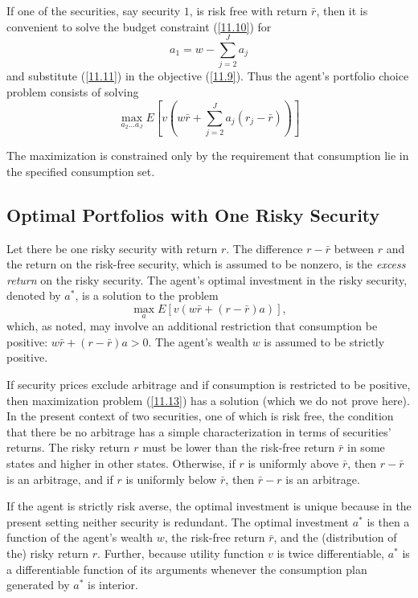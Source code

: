 \documentclass[\topdir/lecture\_notes.tex]{subfiles}
\begin{document}
If one of the securities, say security \(1\), is risk free with return \(\bar{r}\), then it is convenient to solve the budget constraint (\ref{11.10}) for
\begin{equation}
a_{1}=w-\sum_{j=2}^{J} a_{j} \label{11.11}
\end{equation}
and substitute (\ref{11.11}) in the objective (\ref{11.9}). Thus the agent's portfolio choice problem consists of solving
\begin{equation}
\max_{a_{2} \ldots a_{J}} E\left[v\left(w \bar{r}+\sum_{j=2}^{J} a_{j}(r_{j}-\bar{r})\right)\right] \label{eq:portfolio_choice_excess_returns} 
\end{equation}

The maximization is constrained only by the requirement that consumption lie in the specified consumption set.

\subsection{Optimal Portfolios with One Risky Security}
Let there be one risky security with return \(r\). The difference \(r-\bar{r}\) between \(r\) and the return on the risk-free security, which is assumed to be nonzero, is the \emph{excess return} on the risky security. The agent's optimal investment in the risky security, denoted by \(a^{*}\), is a solution to the problem
\begin{equation}
\max _{a} E[v(w \bar{r}+(r-\bar{r}) a)], \label{11.13}
\end{equation}
which, as noted, may involve an additional restriction that consumption be positive: \(w \bar{r}+(r-\bar{r}) a > 0\). The agent's wealth \(w\) is assumed to be strictly positive.

If security prices exclude arbitrage and if consumption is restricted to be positive, then maximization problem (\ref{11.13}) has a solution (which we do not prove here). In the present context of two securities, one of which is risk free, the condition that there be no arbitrage has a simple characterization in terms of securities' returns. The risky return \(r\) must be lower than the risk-free return \(\bar{r}\) in some states and higher in other states. Otherwise, if \(r\) is uniformly above \(\bar{r}\), then \(r-\bar{r}\) is an arbitrage, and if \(r\) is uniformly below \(\bar{r}\), then \(\bar{r}-r\) is an arbitrage.

If the agent is strictly risk averse, the optimal investment is unique because in the present setting neither security is redundant. The optimal investment \(a^{*}\) is then a function of the agent's wealth \(w\), the risk-free return \(\bar{r}\), and the (distribution of the) risky return \(r\). Further, because utility function \(v\) is twice differentiable, \(a^{*}\) is a differentiable function of its arguments whenever the consumption plan generated by \(a^{*}\) is interior.
\end{document}
